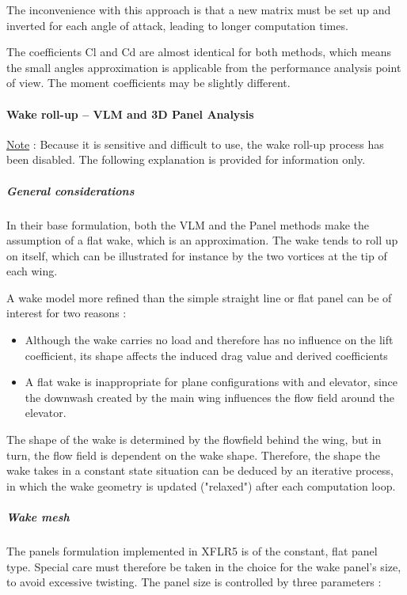 \documentclass[a4paper,twoside,12pt,dvips]{article}
\begin{document}
The inconvenience with this approach is that a new matrix must be set
up and inverted for each angle of attack, leading to longer
computation times.

The coefficients Cl and Cd are almost identical for both methods,
which means the small angles approximation is applicable from the
performance analysis point of view. The moment coefficients may be
slightly different.

\paragraph{Wake roll-up -- VLM and 3D Panel Analysis}

\underline{Note} : Because it is sensitive and difficult to use, the wake roll-up
process has been disabled. The following explanation is provided for
information only.

\subparagraph{General considerations}

In their base formulation, both the VLM and the Panel methods make the
assumption of a flat wake, which is an approximation. The wake tends to
roll up on itself, which can be illustrated for instance by the two
vortices at the tip of each wing.

A wake model more refined than the simple straight line or flat panel
can be of interest for two reasons :

\begin{itemize}
\item Although the wake carries no load and therefore has no
influence on the lift coefficient, its shape affects the induced drag
value and derived coefficients
\item A flat wake is inappropriate for plane configurations
with and elevator, since the downwash created by the main wing
influences the flow field around the elevator.
\end{itemize}

The shape of the wake is determined by the flowfield behind the wing,
but in turn, the flow field is dependent on the wake shape. Therefore,
the shape the wake takes in a constant state situation can be deduced
by an iterative process, in which the wake geometry is updated
("relaxed") after each computation loop.

\subparagraph{Wake mesh}

The panels formulation implemented in XFLR5 is
of the constant, flat panel type. Special care must therefore be taken
in the choice for the wake
panel's size, to avoid excessive twisting. The panel
size is controlled by three parameters :
\end{document}
